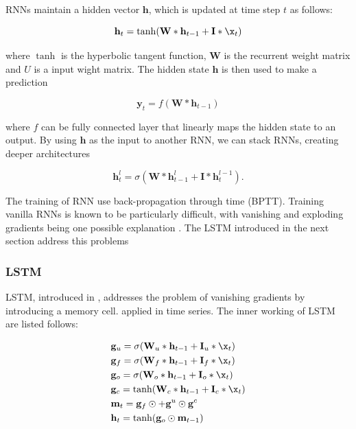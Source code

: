 \documentclass[5p]{elsarticle}
\begin{document}
RNNs maintain a hidden vector $\mathbf h$, which is updated at time step $t$ as follows:

\begin{equation}
	\mathbf h_t = \tanh(\mathbf W * \mathbf h_{t-1} + \mathbf I * \x_t)
\end{equation}

where $\tanh$ is the hyperbolic tangent function, $\mathbf W$ is the recurrent weight matrix and $U$ is a input wight matrix. The hidden state $\mathbf h$ is then used to make a prediction

\begin{equation}
	\mathbf y_t = f(\mathbf W * \mathbf h_{t-1})
\end{equation}

where $f$ can be fully connected layer that linearly maps the hidden state to an output. By using $\mathbf h$ as the input to another RNN, we can stack RNNs, creating deeper architectures 

\begin{equation}
	\mathbf h_t^{l} = \sigma(\mathbf W * \mathbf h_{t-1}^{l} + \mathbf I * \mathbf h_t^{l-1}).
\end{equation}

The training of RNN use back-propagation through time (BPTT). Training vanilla RNNs is known to be particularly difficult, with vanishing and exploding gradients being one possible explanation \cite{pascanu2012difficulty}. The LSTM introduced in the next section address this problems

\subsubsection{LSTM}
LSTM, introduced in \cite{Hochreiter1997LongMemory}, addresses the problem of vanishing gradients by introducing a memory cell. \cite{MalhotraLongSeries} applied in time series. The inner working of LSTM are listed follows:

\begin{equation}
	\begin{split}
		& \mathbf g_u = \sigma(\mathbf W_u * \mathbf h_{t-1} + \mathbf I_u * \x_t) \\
		& \mathbf g_f = \sigma(\mathbf W_f * \mathbf h_{t-1} + \mathbf I_f * \x_t) \\
		& \mathbf g_o = \sigma(\mathbf W_o * \mathbf h_{t-1} + \mathbf I_o * \x_t) \\
		& \mathbf g_c = \tanh(\mathbf W_c * \mathbf h_{t-1} + \mathbf I_c * \x_t) \\
		& \mathbf m_t = \mathbf g_f \odot \mathbf +  \mathbf g^u \odot \mathbf g^c \\
		& \mathbf h_t = \tanh(\mathbf g_o \odot \mathbf m_{t-1}) 
	\end{split}
\end{equation}
\end{document}

